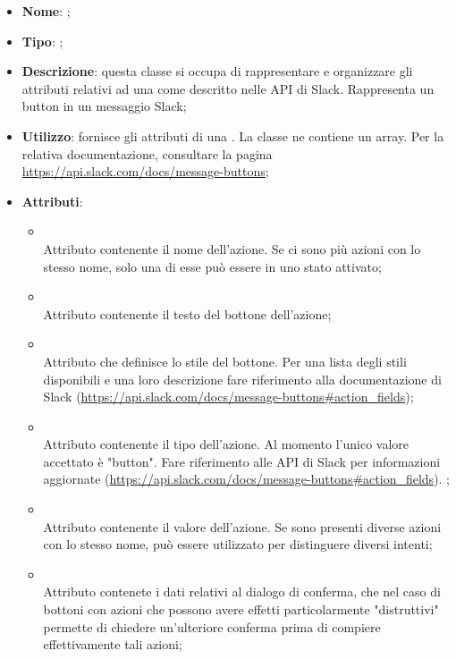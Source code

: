 \begin{itemize}
	\item \textbf{Nome}: ;
	\item \textbf{Tipo}: ;
	\item \textbf{Descrizione}: questa classe si occupa di rappresentare e organizzare gli attributi relativi ad una  come descritto nelle API di Slack. Rappresenta un button in un messaggio Slack;
	\item \textbf{Utilizzo}: fornisce gli attributi di una . La classe  ne contiene un array.
Per la relativa documentazione, consultare la pagina \url{https://api.slack.com/docs/message-buttons};
	\item \textbf{Attributi}:
	\begin{itemize}
		\item[]  \\
		Attributo contenente il nome dell'azione. Se ci sono più azioni con lo stesso nome, solo una di esse può essere in uno stato attivato;
		\item[]  \\
		Attributo contenente il testo del bottone dell'azione;
		\item[]  \\
		Attributo che definisce lo stile del bottone. Per una lista degli stili disponibili e una loro descrizione fare riferimento alla documentazione di Slack (\url{https://api.slack.com/docs/message-buttons#action_fields});
		\item[]  \\
		Attributo contenente il tipo dell'azione. Al momento l'unico valore accettato è "button". Fare riferimento alle API di   Slack per informazioni aggiornate (\url{https://api.slack.com/docs/message-buttons#action_fields}). ;
		\item[]  \\
		Attributo contenente il valore dell'azione. Se sono presenti diverse azioni con lo stesso nome, può essere utilizzato per distinguere diversi intenti;
		\item[]  \\
		Attributo contenete i dati relativi al dialogo di conferma, che nel caso di bottoni con azioni che possono avere effetti particolarmente "distruttivi" permette di chiedere un'ulteriore conferma prima di compiere effettivamente tali azioni;
	\end{itemize}
\end{itemize}

